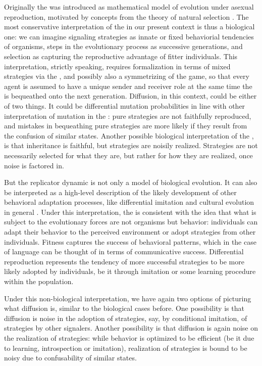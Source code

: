 Originally the \rd was introduced as mathematical model of evolution
under asexual reproduction, motivated by concepts from the theory of
natural selection \citep{TaylorJonker1978:Evolutionary-St}. The most
conservative interpretation of the \rdd in our present context is thus
a biological one: we can imagine signaling strategies as innate or
fixed behaviorial tendencies of organisms, steps in the evolutionary
process as successive generations, and selection as capturing the
reproductive advantage of fitter individuals. This interpretation,
strictly speaking, requires formalization in terms of mixed strategies
via the \rmd, and possibly also a symmetrizing of the game, so that
every agent is assumed to have a unique sender and receiver role at
the same time the is bequeathed onto the next generation. Diffusion,
in this context, could be either of two things. It could be
differential mutation probabilities in line with other interpretation
of mutation in the \rmd
\citep[e.g.][]{NowakKomarova2001:Evolution-of-Un,KomarovaNiyogi2001:The-Evolutionar}:
pure strategies are not faithfully reproduced, and mistakes in
bequeathing pure strategies are more likely if they result from the
confusion of similar states. Another possible biological
interpretation of the \rdd, is that inheritance is faithful, but
strategies are noisily realized. Strategies are not necessarily
selected for what they are, but rather for how they are realized, once
noise is factored in. 

But the replicator dynamic is not only a model of biological
evolution. It can also be interpreted as a high-level description of
the likely development of other behavioral adaptation processes, like
differential imitation and cultural evolution in general
\citep[see][for various derivations of the
\rd]{Sandholm2013:Population-Game}. Under this interpretation, the \rd
is consistent with the idea that what is subject to the evolutionary
forces are not organisms but behavior: individuals can adapt their
behavior to the perceived environment or adopt strategies from other
individuals. Fitness captures the success of behavioral patterns,
which in the case of language can be thought of in terms of
communicative success.  Differential reproduction represents the
tendency of more successful strategies to be more likely adopted by
individuals, be it through imitation or some learning procedure within
the population.  

Under this non-biological interpretation, we have again two options of
picturing what diffusion is, similar to the biological cases
before. One possibility is that diffusion is noise in the adoption of
strategies, say, by conditional imitation, of strategies by other
signalers. Another possibility is that diffusion is again noise on the
realization of strategies: while behavior is optimized to be efficient
(be it due to learning, introspection or imitation), realization of
strategies is bound to be noisy due to confusability of similar
states. 

